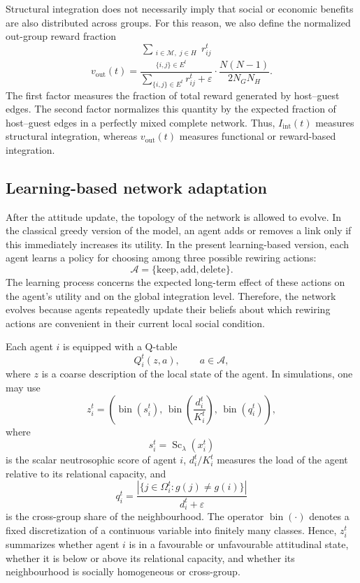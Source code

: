 \documentclass[11pt,a4paper]{article}
\begin{document}
Structural integration does not necessarily imply that social or economic benefits
are also distributed across groups. For this reason, we also define the normalized
out-group reward fraction
\[
v_{\mathrm{out}}(t)
=
\frac{
	\displaystyle\sum_{\substack{i\in\mathcal M,\;j\in H\\ \{i,j\}\in E^t}}
	r_{ij}^t
}{
	\displaystyle\sum_{\{i,j\}\in E^t} r_{ij}^t+\varepsilon
}
\cdot
\frac{N(N-1)}{2N_GN_H}.
\tag{A5}
\]
The first factor measures the fraction of total reward generated by host--guest
edges. The second factor normalizes this quantity by the expected fraction of
host--guest edges in a perfectly mixed complete network. Thus,
$I_{\mathrm{int}}(t)$ measures structural integration, whereas $v_{\mathrm{out}}(t)$
measures functional or reward-based integration.

\subsection{Learning-based network adaptation}

After the attitude update, the topology of the network is allowed to evolve. In the
classical greedy version of the model, an agent adds or removes a link only if this
immediately increases its utility. In the present learning-based version, each agent
learns a policy for choosing among three possible rewiring actions:
\[
\mathcal A=\{\mathrm{keep},\mathrm{add},\mathrm{delete}\}.
\]
The learning process concerns the expected long-term effect of these actions on the
agent's utility and on the global integration level. Therefore, the network evolves
because agents repeatedly update their beliefs about which rewiring actions are
convenient in their current local social condition.

Each agent $i$ is equipped with a Q-table
\[
Q_i^t(z,a),
\qquad
a\in\mathcal A,
\]
where $z$ is a coarse description of the local state of the agent. In simulations, one
may use
\[
z_i^t
=
\left(
\operatorname{bin}(s_i^t),\,
\operatorname{bin}\!\left(\frac{d_i^t}{K_i^t}\right),\,
\operatorname{bin}(q_i^t)
\right),
\tag{A6}
\]
where
\[
s_i^t=\operatorname{Sc}_{\lambda}(x_i^t)
\]
is the scalar neutrosophic score of agent $i$,
$d_i^t/K_i^t$ measures the load of the agent relative to its relational capacity,
and
\[
q_i^t=
\frac{
	\left|\{j\in\Omega_i^t:g(j)\neq g(i)\}\right|
}{
	d_i^t+\varepsilon
}
\tag{A7}
\]
is the cross-group share of the neighbourhood. The operator
$\operatorname{bin}(\cdot)$ denotes a fixed discretization of a continuous variable
into finitely many classes. Hence, $z_i^t$ summarizes whether agent $i$ is in a
favourable or unfavourable attitudinal state, whether it is below or above its
relational capacity, and whether its neighbourhood is socially homogeneous or
cross-group.
\end{document}
